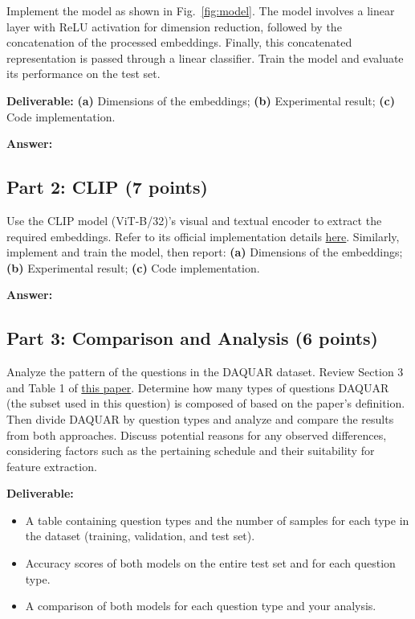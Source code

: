 \documentclass[11pt, oneside]{article}   	%
\begin{document}
Implement the model as shown in Fig.~\ref{fig:model}. The model involves a linear layer with ReLU activation for dimension reduction, followed by the concatenation of the processed embeddings. Finally, this concatenated representation is passed through a linear classifier. Train the model and evaluate its performance on the test set. 

\textbf{Deliverable:} \textbf{(a)} Dimensions of the embeddings; \textbf{(b)} Experimental result; \textbf{(c)} Code implementation.

\textbf{Answer:} \\


\subsection*{Part 2: CLIP (7 points)}
 Use the CLIP model (ViT-B/32)'s visual and textual encoder to extract the required embeddings. Refer to its official implementation details \href{https://github.com/openai/CLIP}{here}. Similarly, implement and train the model, then report: \textbf{(a)} Dimensions of the embeddings; \textbf{(b)} Experimental result; \textbf{(c)} Code implementation.

\textbf{Answer:} \\

\subsection*{Part 3: Comparison and Analysis (6 points)}

Analyze the pattern of the questions in the DAQUAR dataset. Review Section 3 and Table 1 of \href{https://openaccess.thecvf.com/content_ICCV_2017/papers/Kafle_An_Analysis_of_ICCV_2017_paper.pdf}{this paper}. Determine how many types of questions DAQUAR (the subset used in this question) is composed of based on the paper's definition. Then divide DAQUAR by question types and analyze and compare the results from both approaches. Discuss potential reasons for any observed differences, considering factors such as the pertaining schedule and their suitability for feature extraction.

\noindent\textbf{Deliverable:}
\begin{itemize}
\item A table containing question types and the number of samples for each type in the dataset (training, validation, and test set).
\item Accuracy scores of both models on the entire test set and for each question type.
\item A comparison of both models for each question type and your analysis.
\end{itemize}
\end{document}
